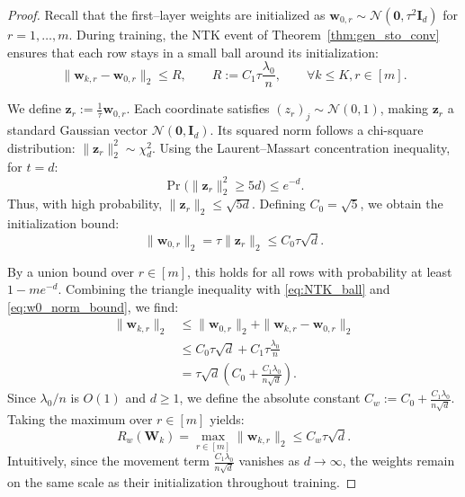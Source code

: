 \documentclass[10pt]{article} %
\theoremstyle{definition}
\theoremstyle{plain}
\begin{document}
\begin{proof}
Recall that the first--layer weights are initialized as $\mathbf{w}_{0,r} \sim \mathcal{N}(\mathbf{0}, \tau^2 \mathbf{I}_d)$ for $r=1,\dots,m$. During training, the NTK event of Theorem~\ref{thm:gen_sto_conv} ensures that each row stays in a small ball around its initialization:
\begin{equation}
    \label{eq:NTK_ball}
    \|\mathbf{w}_{k,r} - \mathbf{w}_{0,r}\|_2 \le R, \qquad R := C_1 \tau \frac{\lambda_0}{n}, \qquad \forall k \le K, r \in [m].
\end{equation}

We define $\mathbf{z}_r := \frac{1}{\tau}\mathbf{w}_{0,r}$. Each coordinate satisfies $(z_r)_j \sim \mathcal{N}(0,1)$, making $\mathbf{z}_r$ a standard Gaussian vector $\mathcal{N}(\mathbf{0}, \mathbf{I}_d)$. Its squared norm follows a chi-square distribution: $\|\mathbf{z}_r\|_2^2 \sim \chi^2_d$. Using the Laurent--Massart concentration inequality, for $t=d$:
\[
    \Pr\big( \|\mathbf{z}_r\|_2^2 \ge 5d \big) \le e^{-d}.
\]
Thus, with high probability, $\|\mathbf{z}_r\|_2 \le \sqrt{5d}$. Defining $C_0 = \sqrt{5}$, we obtain the initialization bound:
\begin{equation}
    \label{eq:w0_norm_bound}
    \|\mathbf{w}_{0,r}\|_2 = \tau \|\mathbf{z}_r\|_2 \le C_0 \tau \sqrt{d}.
\end{equation}

By a union bound over $r \in [m]$, this holds for all rows with probability at least $1 - me^{-d}$. Combining the triangle inequality with \eqref{eq:NTK_ball} and \eqref{eq:w0_norm_bound}, we find:
\begin{align*}
    \|\mathbf{w}_{k,r}\|_2 &\le \|\mathbf{w}_{0,r}\|_2 + \|\mathbf{w}_{k,r} - \mathbf{w}_{0,r}\|_2 \\
    &\le C_0 \tau \sqrt{d} + C_1 \tau \frac{\lambda_0}{n} \\
    &= \tau \sqrt{d} \left( C_0 + \frac{C_1 \lambda_0}{n \sqrt{d}} \right).
\end{align*}
Since $\lambda_0/n$ is $O(1)$ and $d \ge 1$, we define the absolute constant $C_w := C_0 + \frac{C_1 \lambda_0}{n \sqrt{d}}$. Taking the maximum over $r \in [m]$ yields:
\begin{equation}
    R_w(\mathbf{W}_k) = \max_{r \in [m]} \|\mathbf{w}_{k,r}\|_2 \le C_w \tau \sqrt{d}.
\end{equation}
Intuitively, since the movement term $\frac{C_1 \lambda_0}{n \sqrt{d}}$ vanishes as $d \to \infty$, the weights remain on the same scale as their initialization throughout training.
\end{proof}
\end{document}
